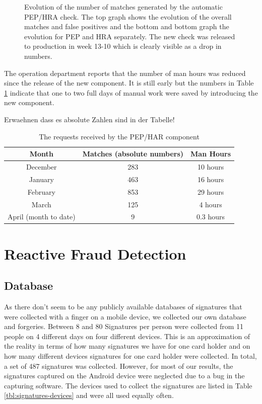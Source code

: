 \documentclass[a4paper, oneside]{csthesis}
\begin{document}
\begin{figure}
        \caption{Evolution of the number of matches generated by the automatic PEP/HRA check. The top graph shows the evolution of the overall matches and false positives and the bottom and bottom graph the evolution for PEP and HRA separately. The new check was released to production in week 13-10 which is clearly visible as a drop in numbers.}
        \label{fig:pep-hra-charts}
\end{figure}

The operation department reports that the number of man hours was reduced since the release of the new component. It is still early but the numbers in Table \ref{tbl:man-hours} indicate that one to two full days of manual work were saved by introducing the new component.

Erwaehnen dass es absolute Zahlen sind in der Tabelle!

\begin{table}[tb]
    \begin{center}
        \begin{tabular}{c|c|c}Month & Matches (absolute numbers) & Man Hours \\ \hline
        December & 283 & 10 hours \\ \hdashline[0.5pt/3pt]
        January & 463 & 16 hours  \\ \hdashline[0.5pt/3pt]
        February & 853 & 29 hours \\ \hline \hline
        March & 125 & 4 hours \\ \hdashline[0.5pt/3pt]
        April (month to date) & 9 & 0.3 hours \\ \hline
        \end{tabular}
    \end{center}
    \label{tbl:man-hours}
    \caption{The requests received by the PEP/HAR component}
\end{table}



\section{Reactive Fraud Detection}
\label{sec:exp-reactive}

\subsection{Database}

As there don't seem to be any publicly available databases of signatures that were collected with a finger on a mobile device, we collected our own database and forgeries.
Between 8 and 80 Signatures per person were collected from 11 people on 4 different days on four different devices. This is an approximation of the reality in terms of how many signatures we have for one card holder and on how many different devices signatures for one card holder were collected. In total, a set of 487 signatures was collected. However, for most of our results, the signatures captured on the Android device were neglected due to a bug in the capturing software.
The devices used to collect the signatures are listed in Table \ref{tbl:signatures-devices} and were all used equally often.
\end{document}
